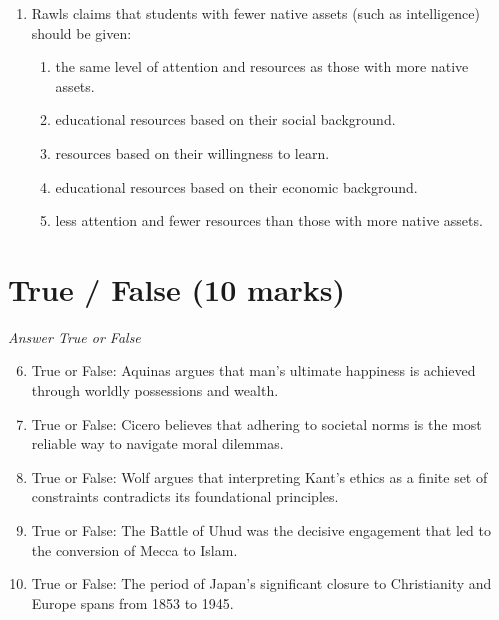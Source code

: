 \documentclass[12pt]{article}
\begin{document}
\begin{enumerate}[label=\arabic*.]
\begin{enumerate}[label=(\alph*)]
    \item the existence of the divine.
    \item the causes of good and evil.
    \item both a and b.
\end{enumerate}
\item Rawls claims that students with fewer native assets (such as intelligence) should be given:
\begin{enumerate}[label=(\alph*)]
    \item the same level of attention and resources as those with more native assets.
    \item educational resources based on their social background.
    \item resources based on their willingness to learn.
    \item educational resources based on their economic background.
    \item less attention and fewer resources than those with more native assets.
\end{enumerate}
\end{enumerate}

\section*{True / False (10 marks)}
\textit{Answer True or False}
\begin{enumerate}[label=\arabic*.]
\setcounter{enumi}{5}
\item True or False: Aquinas argues that man's ultimate happiness is achieved through worldly possessions and wealth.
\item True or False: Cicero believes that adhering to societal norms is the most reliable way to navigate moral dilemmas.
\item True or False: Wolf argues that interpreting Kant's ethics as a finite set of constraints contradicts its foundational principles.
\item True or False: The Battle of Uhud was the decisive engagement that led to the conversion of Mecca to Islam.
\item True or False: The period of Japan's significant closure to Christianity and Europe spans from 1853 to 1945.
\end{enumerate}
\end{document}
